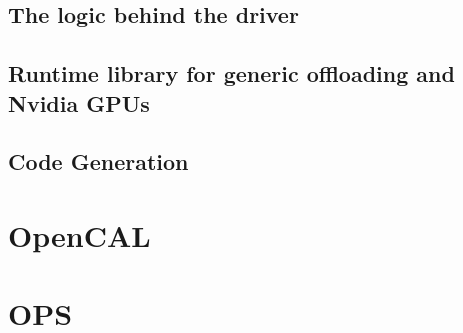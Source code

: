 
\subsection{The logic behind the driver}

\subsection{Runtime library for generic offloading and Nvidia GPUs}

\subsection{Code Generation}


\section{OpenCAL}

\section{OPS}